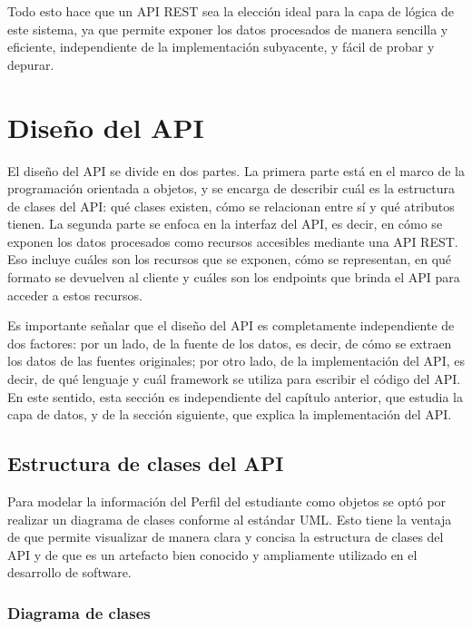 Todo esto hace que un \gls{API REST} sea la elección ideal para la capa de lógica de este sistema, ya que permite exponer los datos procesados de manera sencilla y eficiente, independiente de la implementación subyacente, y fácil de probar y depurar.

\section{Diseño del API}

El diseño del \gls{API} se divide en dos partes. La primera parte está en el marco de la programación orientada a objetos, y se encarga de describir cuál es la estructura de clases del \gls{API}: qué clases existen, cómo se relacionan entre sí y qué atributos tienen. La segunda parte se enfoca en la interfaz del \gls{API}, es decir, en cómo se exponen los datos procesados como recursos accesibles mediante una \gls{API REST}. Eso incluye cuáles son los recursos que se exponen, cómo se representan, en qué formato se devuelven al cliente y cuáles son los endpoints que brinda el \gls{API} para acceder a estos recursos.

Es importante señalar que el diseño del \gls{API} es completamente independiente de dos factores: por un lado, de la fuente de los datos, es decir, de cómo se extraen los datos de las fuentes originales; por otro lado, de la implementación del \gls{API}, es decir, de qué lenguaje y cuál framework se utiliza para escribir el código del \gls{API}. En este sentido, esta sección es independiente del capítulo anterior, que estudia la capa de datos, y de la sección siguiente, que explica la implementación del \gls{API}.

\subsection{Estructura de clases del API}

Para modelar la información del Perfil del estudiante como objetos se optó por realizar un diagrama de clases conforme al estándar \gls{UML}. Esto tiene la ventaja de que permite visualizar de manera clara y concisa la estructura de clases del \gls{API} y de que es un artefacto bien conocido y ampliamente utilizado en el desarrollo de software.

\subsubsection{Diagrama de clases}

